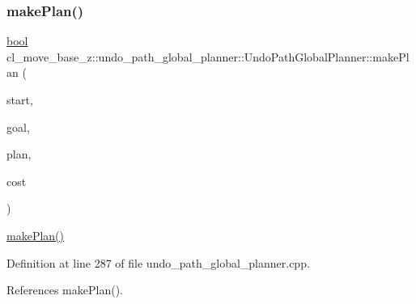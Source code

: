 \mbox{\label{classcl__move__base__z_1_1undo__path__global__planner_1_1UndoPathGlobalPlanner_aca09f640e4bda4d5ccc9613276fd3f71}} 
\subsubsection{\texorpdfstring{make\+Plan()}{makePlan()}\hspace{0.1cm}{\footnotesize\ttfamily [2/2]}}
{\footnotesize\ttfamily \hyperlink{classbool}{bool} cl\+\_\+move\+\_\+base\+\_\+z\+::undo\+\_\+path\+\_\+global\+\_\+planner\+::\+Undo\+Path\+Global\+Planner\+::make\+Plan (\begin{DoxyParamCaption}\item[{const geometry\+\_\+msgs\+::\+Pose\+Stamped \&}]{start,  }\item[{const geometry\+\_\+msgs\+::\+Pose\+Stamped \&}]{goal,  }\item[{std\+::vector$<$ geometry\+\_\+msgs\+::\+Pose\+Stamped $>$ \&}]{plan,  }\item[{double \&}]{cost }\end{DoxyParamCaption})}

\hyperlink{classcl__move__base__z_1_1undo__path__global__planner_1_1UndoPathGlobalPlanner_a46034d27c0811abae440009457a7f8b0}{make\+Plan()} 

Definition at line 287 of file undo\+\_\+path\+\_\+global\+\_\+planner.\+cpp.



References make\+Plan().



